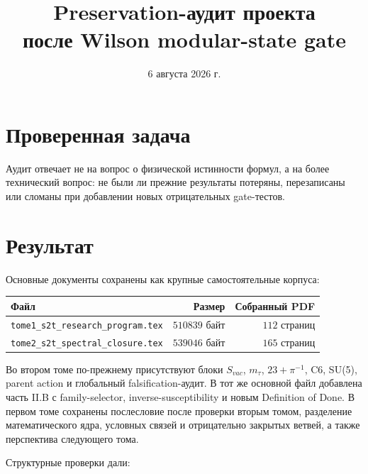 \documentclass[12pt,a4paper]{article}
\title{Preservation-аудит проекта\\
после Wilson modular-state gate}
\author{}
\date{6 августа 2026 г.}
\begin{document}
\maketitle

\section{Проверенная задача}

Аудит отвечает не на вопрос о физической истинности формул, а на более
технический вопрос: не были ли прежние результаты потеряны, перезаписаны или
сломаны при добавлении новых отрицательных gate-тестов.

\section{Результат}

Основные документы сохранены как крупные самостоятельные корпуса:
\begin{center}
\begin{tabular}{lrr}
\toprule
Файл & Размер & Собранный PDF \\
\midrule
\texttt{tome1\_s2t\_research\_program.tex} & $510839$ байт & $112$ страниц \\
\texttt{tome2\_s2t\_spectral\_closure.tex} & $539046$ байт & $165$ страниц \\
\bottomrule
\end{tabular}
\end{center}

Во втором томе по-прежнему присутствуют блоки $S_{vac}$, $m_\tau$,
$23+\pi^{-1}$, C6, SU(5), parent action и глобальный falsification-аудит.
В тот же основной файл добавлена часть II.B с family-selector,
inverse-susceptibility и новым Definition of Done.
В первом томе сохранены послесловие после проверки вторым томом, разделение
математического ядра, условных связей и отрицательно закрытых ветвей, а также
перспектива следующего тома.

Структурные проверки дали:
\end{document}
